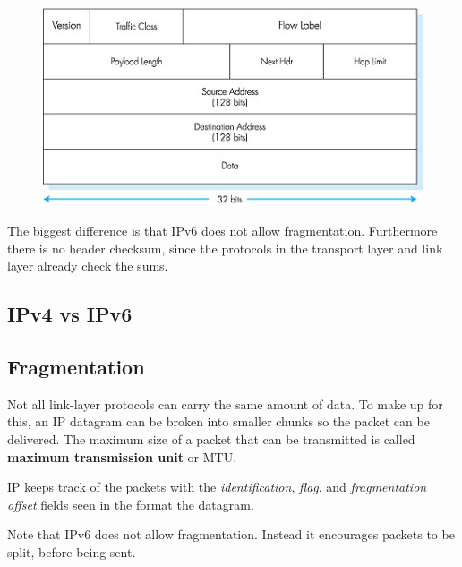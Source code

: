\begin{figure}
  \begin{center}
    \includegraphics[scale=0.5]{04-40.jpg}
  \end{center}
\end{figure}

The biggest difference is that IPv6 does not allow
fragmentation. Furthermore there is no header checksum, since the
protocols in the transport layer and link layer already check the
sums.

\subsection{IPv4 vs IPv6}

\subsection{Fragmentation}
Not all link-layer protocols can carry the same amount of data. To
make up for this, an IP datagram can be broken into smaller chunks so
the packet can be delivered. The maximum size of a packet that can be
transmitted is called \textbf{maximum transmission unit} or MTU.

IP keeps track of the packets with the \textit{identification},
\textit{flag}, and \textit{fragmentation offset} fields seen in the
format the datagram.

Note that IPv6 does not allow fragmentation. Instead it encourages
packets to be split, before being sent.